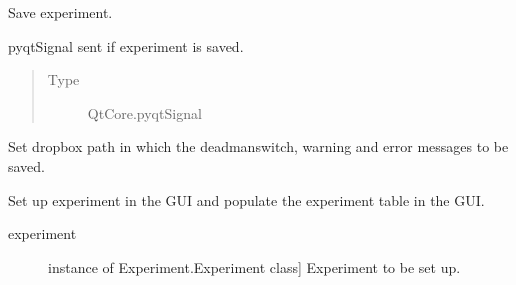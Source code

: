 \documentclass[letterpaper,10pt,english]{sphinxmanual}
\begin{document}
\begin{fulllineitems}
\begin{fulllineitems}
\end{fulllineitems}


\begin{fulllineitems}
\label{\detokenize{NoSeMazeController/main:main.MainApp.save_experiment}}
\pysigstartsignatures
{}
\pysigstopsignatures
\sphinxAtStartPar
Save experiment.

\end{fulllineitems}


\begin{fulllineitems}
\label{\detokenize{NoSeMazeController/main:main.MainApp.saved}}
\pysigstartsignatures
{}
\pysigstopsignatures
\sphinxAtStartPar
pyqtSignal sent if experiment is saved.
\begin{quote}\begin{description}
\item[{Type}] \leavevmode
\sphinxAtStartPar
QtCore.pyqtSignal

\end{description}\end{quote}

\end{fulllineitems}


\begin{fulllineitems}
\label{\detokenize{NoSeMazeController/main:main.MainApp.set_dropbox_path}}
\pysigstartsignatures
{}
\pysigstopsignatures
\sphinxAtStartPar
Set dropbox path in which the deadman\sphinxhyphen{}switch, warning and error messages to be saved.

\end{fulllineitems}


\begin{fulllineitems}
\label{\detokenize{NoSeMazeController/main:main.MainApp.setup_experiment_bindings}}
\pysigstartsignatures
{}
\pysigstopsignatures
\sphinxAtStartPar
Set up experiment in the GUI and populate the experiment table in the GUI.
\begin{description}
\item[{experiment}] \leavevmode{[}instance of Experiment.Experiment class{]}
\sphinxAtStartPar
Experiment to be set up.


\end{description}
\end{fulllineitems}
\end{fulllineitems}
\end{document}
